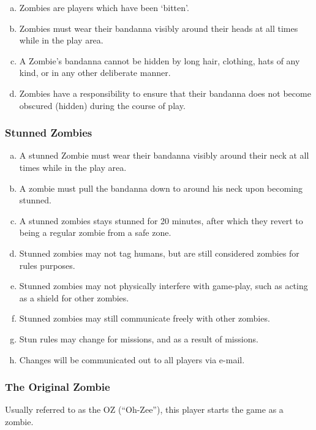 \documentclass[a4paper,12pt]{article}
\begin{document}
\begin{enumerate}[(a)]
    \item Zombies are players which have been `bitten'.
    \item Zombies must wear their bandanna visibly around their heads at all times while in the play area.
    \item A Zombie's bandanna cannot be hidden by long hair, clothing, hats of any kind, or in any other deliberate manner.
    \item Zombies have a responsibility to ensure that their bandanna does not become obscured (hidden) during the course of play.

\end{enumerate}

\subsubsection{Stunned Zombies}
\label{StunnedZombies}
\begin{enumerate}[(a)]
    \item A stunned Zombie must wear their bandanna visibly around their neck at all times while in the play area.
    \item A zombie must pull the bandanna down to around his neck upon becoming stunned.
    \item A stunned zombies stays stunned for 20 minutes, after which they revert to being a regular zombie from a safe zone.
    \item Stunned zombies may not tag humans, but are still considered zombies for rules purposes.
    \item Stunned zombies may not physically interfere with game-play, such as acting as a shield for other zombies.
    \item Stunned zombies may still communicate freely with other zombies.
    \item Stun rules may change for missions, and as a result of missions. 
    \item Changes will be communicated out to all players via e-mail.
\end{enumerate}


\subsubsection{The Original Zombie}
\label{OZrules}
Usually referred to as the OZ (``Oh-Zee''), this player starts the game as a zombie.
\end{document}
